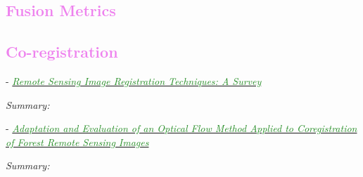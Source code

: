 \documentclass[]{article}
\newcommand{\paperentry}[4]{
            \hangindent=1cm
            \textcolor{red}{\cite{#1}} - \href{run:../References/#3}{\textcolor{ForestGreen}{\textit{#2}}}
            
            \noindent            
            \begin{minipage}[t]{0.1\linewidth}\hfill\end{minipage}
            \begin{minipage}[t]{0.8\linewidth}\textcolor{NavyBlue}{{\textit{Summary:}}}#4\end{minipage}
            \vspace{.25cm}
          }
\begin{document}
		
	\textcolor{Violet}{\subsection{Fusion Metrics}}

	\textcolor{Violet}{\subsection{Co-registration}}
	
		\paperentry{Dawn2010SurveyRemoteSensingImageRegistration}
		{Remote Sensing Image Registration Techniques: A Survey}
		{Fusion/Dawn2010SurveyRemoteSensingImageRegistration.pdf}
		{}
	
		\paperentry{Brigot2016CoregistrationForestRemoteSensingImages}
		{Adaptation and Evaluation of an Optical Flow Method Applied to Coregistration of Forest Remote Sensing Images}
		{Fusion/Brigot2016CoregistrationForestRemoteSensingImages.pdf}
		{}
		
\end{document}
